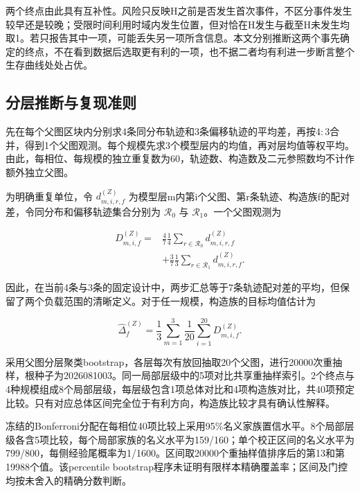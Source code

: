 \documentclass[UTF8,a4paper,twocolumn,fontset=none,zihao=5]{ctexart}
\begin{document}
两个终点由此具有互补性。风险只反映H之前是否发生首次事件，不区分事件发生较早还是较晚；受限时间利用时域内发生位置，但对恰在H发生与截至H未发生均取1。若只报告其中一项，可能丢失另一项所含信息。本文分别推断这两个事先确定的终点，不在看到数据后选取更有利的一项，也不据二者均有利进一步断言整个生存曲线处处占优。


\subsection{分层推断与复现准则}

先在每个父图区块内分别求4条同分布轨迹和3条偏移轨迹的平均差，再按4$:$3合并，得到1个父图观测。每个规模先求3个模型层内的均值，再对层均值等权平均。由此，每相位、每规模的独立重复数为60，轨迹数、构造数及二元参照数均不计作额外独立父图。


为明确重复单位，令 $d_{m,i,r,f}^{(Z)}$ 为模型层m内第i个父图、第r条轨迹、构造族f的配对差，令同分布和偏移轨迹集合分别为 $\mathcal R_0$ 与 $\mathcal R_1$。一个父图观测为



\begin{equation}
\begin{aligned}D_{m,i,f}^{(Z)}={}&\frac{4}{7}\frac{1}{4}\sum_{r\in\mathcal R_0}d_{m,i,r,f}^{(Z)}\\&+\frac{3}{7}\frac{1}{3}\sum_{r\in\mathcal R_1}d_{m,i,r,f}^{(Z)}.\end{aligned}
\label{eq:15}\end{equation}


因此，在当前4条与3条的固定设计中，两步汇总等于7条轨迹配对差的平均，但保留了两个负载范围的清晰定义。对于任一规模，构造族的目标均值估计为



\begin{equation}
\widehat\Delta_f^{(Z)}=\frac{1}{3}\sum_{m=1}^{3}\frac{1}{20}\sum_{i=1}^{20}D_{m,i,f}^{(Z)}.
\label{eq:16}\end{equation}


采用父图分层聚类bootstrap，各层每次有放回抽取20个父图，进行20000次重抽样，根种子为2026081003。同一局部层级中的5项对比共享重抽样索引。2个终点与4种规模组成8个局部层级，每层级包含1项总体对比和4项构造族对比，共40项预定比较。只有对应总体区间完全位于有利方向，构造族比较才具有确认性解释。


冻结的Bonferroni分配在每相位40项比较上采用95\%名义家族置信水平。8个局部层级各含5项比较，每个局部家族的名义水平为159/160；单个校正区间的名义水平为799/800，每侧经验尾概率为1/1600。区间取20000个重抽样值排序后的第13和第19988个值。该percentile bootstrap程序未证明有限样本精确覆盖率；区间及门控均按未舍入的精确分数判断。
\end{document}
